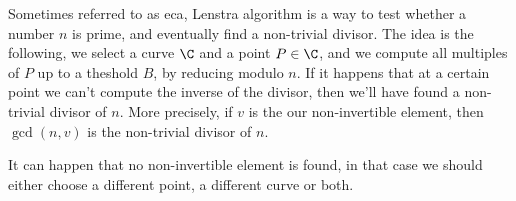 \documentclass{subfiles}
\begin{document}
    Sometimes referred to as \gls{eca}, Lenstra algorithm is a way to test whether a number \(n\)
        is prime, and eventually find a non-trivial divisor.
        The idea is the following, we select a curve \(\C\) and a point \(P \in \C\),
        and we compute all multiples of \(P\) up to a theshold \(B\), by reducing modulo \(n\).
        If it happens that at a certain point we can't compute the inverse of the divisor,
        then we'll have found a non-trivial divisor of \(n\).
        More precisely, if \(v\) is the our non-invertible element, 
        then \(\gcd(n, v)\) is the non-trivial divisor of \(n\).

    It can happen that no non-invertible element is found,
        in that case we should either choose a different point,
        a different curve or both.
\end{document}
